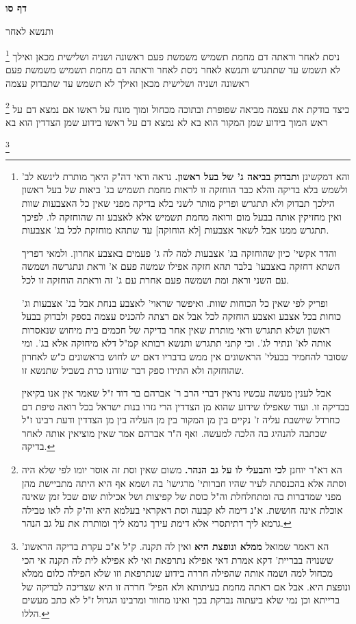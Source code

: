 \documentclass[12pt, openany]{book}
\newcommand{\sethebfont}{
\fontsize{10.5pt}{21.0pt} \selectfont
}
\newcommand{\twocol}[1]{
	{\sethebfont \begin{multicols}{2}
			#1
	\end{multicols}}	
}
\newcommand{\sectname}{}
\newcommand{\newsection}[1]{
	\addcontentsline{toc}{section}{#1}
	\renewcommand{\sectname}{#1}	
	\vspace{-\baselineskip}
	\begin{center}
		\textbf{%
\fontsize{16pt}{16pt}\selectfont
			#1}
	\end{center}
	\vspace{-\baselineskip}
	\nopagebreak
}
\newcommand{\footnotecomment}[1]{
	\renewcommand\thefootnote{}
	\footnote{#1}}
\newcommand{\commenta}[1]{\footnotecomment{#1}}
\begin{document}
\newsection{דף סו}
\twocol{ותנשא לאחר 
\commenta{ והא דמקשינן \textbf{ותבדוק בביאה ג' של בעל ראשון.} נראה ודאי דה"ק היאך מותרת לינשא לב' ולשמש בלא בדיקה והלא כבר הוחזקה זו לראות מחמת תשמיש בג' ביאות של בעל ראשון הילכך תבדוק ולא תתגרש ופריק מותר לשני בלא בדיקה מפני שאין כל האצבעות שוות ואין מחזיקין אותה בבעל מום ורואה מחמת תשמיש אלא לאצבע זה שהוחזקה לו. לפיכך תתגרש ממנו אבל לשאר אצבעות [לא הוחזקה] עד שתהא מוחזקת לכל בג' אצבעות.\par והדר אקשי' כיון שהוחזקה בג' אצבעות למה לה ג' פעמים באצבע אחרון. ולמאי דפריך השתא דחזקה באצבעו' בלבד תהא חזקה אפילו שמשה פעם א' וראת ונתגרשה ושמשה עם השני וראת ומת ושמשה פעם אחרת עם ג' זה וראתה הוחזקה זו לכל.\par ופריק לפי שאין כל הכוחות שוות. ואיפשר שראוי' לאצבע בנחת אבל בג' אצבעות וג' כוחות בכל אצבע ואצבע הוחזקה לכל אבל אם רצתה להכניס עצמה בספק ולבדוק בבעל ראשון ושלא תתגרש ודאי מותרת שאין אחר בדיקה של חכמים בית מיחוש שנאסרות אותה לא' ונתיר לג'. וכי קתני תתגרש ותנשא רבותא קמ"ל דלא מיחזקה אלא בג'. ומי שסובר להחמיר בבעלי' הראשונים אין ממש בדבריו דאם יש לחוש בראשונים כ"ש לאחרון שהוחזקה ולא התירו ספק דבר שזדונו כרת בשביל שתנשא זו.\par אבל לענין מעשה עכשיו נראין דברי הרב ר' אברהם בר דוד ז"ל שאמר אין אנו בקיאין בבדיקה זו. ועוד שאפילו שידוע שהוא מן הצדדין הרי גזרו בנות ישראל בכל רואה טיפת דם כחרדל שיושבת עליה ז' נקיים בין מן המקור בין מן העליה בין מן הצדדין ודעת רבינו ז"ל שכתבה להנהיג בה הלכה למעשה. ואף ה"ר אברהם אמר שאין מוציאין אותה לאחר בדיקה. }
ניסת לאחר וראתה דם מחמת תשמיש משמשת פעם ראשונה ושניה ושלישית מכאן ואילך לא תשמש עד שתתגרש ותנשא לאחר ניסת לאחר וראתה דם מחמת תשמיש משמשת פעם ראשונה ושניה ושלישית מכאן ואילך לא תשמש עד שתבדוק עצמה 
\commenta{הא דא"ר יוחנן \textbf{לכי והבעלי לו על גב הנהר.} משום שאין וסת זה אוסר יומו לפי שלא היה וסתה אלא בהכנסתה לעיר שהיו חברותי' מרגישו' בה ושמא אף היא היתה מתביישת מהן מפני שמדברות בה ומתחלחלת וה"ל כוסת של קפיצות ושל אכילות שום שכל זמן שאינה אוכלת אינה חוששת. א"נ דימה לא קבעה וסת דאקראי בעלמא היא וה"ק לה לאו טבילה גרמא ליך דתיתסרי אלא דימת עירך גרמא ליך ומותרת את על גב הנהר. }
כיצד בודקת את עצמה מביאה שפופרת ובתוכה מכחול ומוך מונח על ראשו אם נמצא דם על ראש המוך בידוע שמן המקור הוא בא לא נמצא דם על ראשו בידוע שמן הצדדין הוא בא 
\commenta{הא דאמר שמואל \textbf{ממלא ונופצת היא} ואין לה תקנה. ק"ל א"כ עקרת בדיקה הראשונ' ששנויה בבריית' דקא אמרת דאי אפילא נתרפאת ואי לא אפילא לית לה תקנה אי הכי מכחול למה ושמה אותה שהפילה חררה בידוע שנתרפאת וזו שלא הפילה כלום ממלא ונופצת היא. אבל אם ראתה מחמת בעיתותא ולא הפיל' חררה זו היא שצריכה לבדיקה של ברייתא וכן נמי שלא ביעתוה נבדקת בכך ואינו מחוור ומרבינו הגדול ז"ל לא כתב מעשים הללו. }
}
\end{document}
